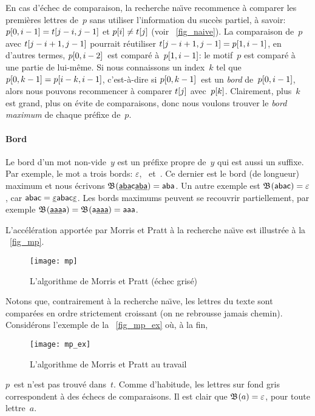En cas d'échec de comparaison, la recherche na\"{\i}ve recommence à
comparer les premières lettres de~\(p\) sans utiliser l'information du
succès partiel, à savoir: \({p}[{0,i-1}] = {t}[{j-i,j-1}]\) et
\({p}[{i}] \neq {t}[{j}]\) (voir \fig~\vref{fig_naive}). La
comparaison de~\(p\) avec \({t}[{j-i+1,j-1}]\) pourrait réutiliser
\({t}[{j-i+1,j-1}] = {p}[{1,i-1}]\), en d'autres termes,
\({p}[{0,i-2}]\)~est comparé à~\({p}[{1,i-1}]\): le motif~\(p\)
est comparé à une partie de lui-même. Si nous connaissons un
index~\(k\) tel que \({p}[{0,k-1}] = {p}[{i-k,i-1}]\),
c'est-à-dire si \({p}[{0,k-1}]\)~est un \emph{bord}
de~\({p}[{0,i-1}]\), alors nous pouvons recommencer à comparer
\({t}[{j}]\) avec~\({p}[{k}]\). Clairement, plus~\(k\) est grand,
plus on évite de comparaisons, donc nous voulons trouver le \emph{bord
  maximum} de chaque préfixe de~\(p\).

\paragraph{Bord}

Le bord d'un mot non-vide~\(y\) est un préfixe propre de~\(y\) qui est
aussi un suffixe. Par exemple, le mot  a trois bords:
\(\varepsilon\), ~et~. Ce dernier est le bord (de
longueur) maximum et nous écrivons
\(\mathfrak{B}^{}(\underline{\textsf{aba}}\textsf{c}\underline{\textsf{aba}}) =
\textsf{aba}\). Un autre exemple est \(\mathfrak{B}^{}(\textsf{abac}) =
\varepsilon\), car \(\textsf{abac} =
\underline{\varepsilon}\textsf{abac}\underline{\varepsilon}\). Les bords
maximums peuvent se recouvrir partiellement, par exemple
\(\mathfrak{B}^{}(\underline{\textsf{aaa}}\textsf{a}) =
\mathfrak{B}^{}(\textsf{a}\underline{\textsf{aaa}}) = \textsf{aaa}\).

L'accélération apportée par Morris et Pratt à la recherche na\"{\i}ve
est illustrée à la \fig~\vref{fig_mp}.
\begin{figure}[b]
\centering
\texttt{[image: mp]}
\caption{L'algorithme de Morris et Pratt (échec grisé)
\label{fig_mp}}
\end{figure}
Notons que, contrairement à la recherche na\"{\i}ve, les lettres du
texte sont comparées en ordre strictement croissant (on ne rebrousse
jamais chemin). Considérons l'exemple de la \fig~\vref{fig_mp_ex} où,
à la fin,
\begin{figure}[t]
\centering
\texttt{[image: mp\_ex]}
\caption{L'algorithme de Morris et Pratt au travail
\label{fig_mp_ex}}
\end{figure}
\(p\)~est n'est pas trouvé dans~\(t\). Comme d'habitude, les lettres
sur fond gris correspondent à des échecs de comparaisons. Il est clair
que \(\mathfrak{B}^{}(a) = \varepsilon\), pour toute lettre~\(a\).

